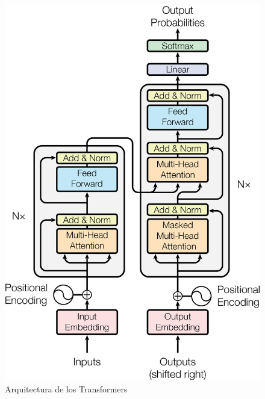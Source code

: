 \begin{figure}[t]
	\centering
	\includegraphics[scale=0.15]{Images & Logos/Transformers.png} 
	\caption{Arquitectura de los Transformers}
	\label{figure:transformers}
\end{figure}
 

